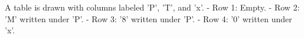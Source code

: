 A table is drawn with columns labeled 'P', 'T', and 'x'.  
- Row 1: Empty.  
- Row 2: 'M' written under 'P'.  
- Row 3: '8' written under 'P'.  
- Row 4: '0' written under 'x'.
